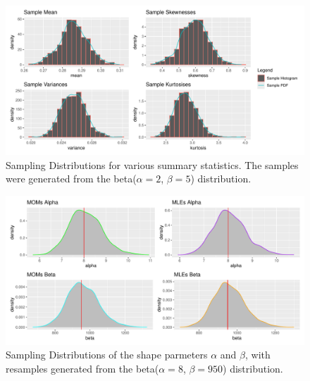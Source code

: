 \documentclass{article}\usepackage[]{graphicx}\usepackage[]{xcolor}
\makeatletter
\def\maxwidth{ %
  \ifdim\Gin@nat@width>\linewidth
    \linewidth
  \else
    \Gin@nat@width
  \fi
}
\newenvironment{knitrout}{}{} %
\makeatother
\begin{document}
\begin{figure}[H]
 \begin{center}
\begin{knitrout}
\color{fgcolor}
\includegraphics[width=\maxwidth]{figure/unnamed-chunk-4-1} 
\end{knitrout}
 \caption{Sampling Distributions for various summary statistics. The samples were generated from the beta($\alpha = 2$, $\beta = 5$) distribution.}
 \label{plot4} %
 \end{center}
 \end{figure}
 

\begin{figure}[H]
 \begin{center}
\begin{knitrout}
\color{fgcolor}
\includegraphics[width=\maxwidth]{figure/unnamed-chunk-5-1} 
\end{knitrout}
 \caption{Sampling Distributions of the shape parmeters $\alpha$ and $\beta$, with resamples generated from the beta($\alpha = 8$, $\beta = 950$) distribution.}
 \label{plot5} %
 \end{center}
 \end{figure}
\end{document}
